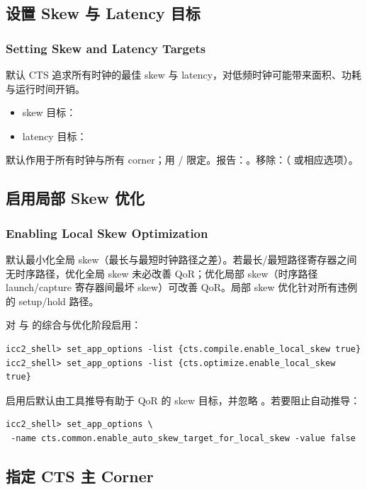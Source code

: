 \subsection{设置 Skew 与 Latency 目标}
\subsubsection*{Setting Skew and Latency Targets}

默认 CTS 追求所有时钟的最佳 skew 与 latency，对低频时钟可能带来面积、功耗与运行时间开销。
\begin{itemize}
  \item skew 目标：
  \item latency 目标：
\end{itemize}
默认作用于所有时钟与所有 corner；用 / 限定。报告：。移除：（ 或相应选项）。

\subsection{启用局部 Skew 优化}
\subsubsection*{Enabling Local Skew Optimization}

默认最小化全局 skew（最长与最短时钟路径之差）。若最长/最短路径寄存器之间无时序路径，优化全局 skew 未必改善 QoR；优化局部 skew（时序路径 launch/capture 寄存器间最坏 skew）可改善 QoR。局部 skew 优化针对所有违例的 setup/hold 路径。

对  与  的综合与优化阶段启用：
\begin{lstlisting}
icc2_shell> set_app_options -list {cts.compile.enable_local_skew true}
icc2_shell> set_app_options -list {cts.optimize.enable_local_skew true}
\end{lstlisting}
启用后默认由工具推导有助于 QoR 的 skew 目标，并忽略 。若要阻止自动推导：
\begin{lstlisting}
icc2_shell> set_app_options \
 -name cts.common.enable_auto_skew_target_for_local_skew -value false
\end{lstlisting}

\subsection{指定 CTS 主 Corner}
